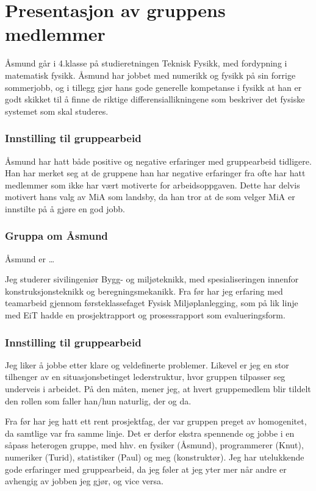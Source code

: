 \chapter{Presentasjon av gruppens medlemmer}
Åsmund går i 4.klasse på studieretningen Teknisk Fysikk, med fordypning 
i matematisk fysikk. Åsmund har jobbet med numerikk og fysikk på sin forrige 
sommerjobb, og i tillegg gjør hans gode generelle kompetanse i fysikk at han 
er godt skikket til å finne de riktige differensiallikningene som beskriver 
det fysiske systemet som skal studeres.

\subsection*{Innstilling til gruppearbeid}
Åsmund har hatt både positive og negative erfaringer med gruppearbeid tidligere.
Han har merket seg at de gruppene han har negative erfaringer fra ofte har hatt
medlemmer som ikke har vært motiverte for arbeidsoppgaven. Dette har delvis
motivert hans valg av MiA som landsby, da han tror at de som velger MiA er
innstilte på å gjøre en god jobb.

\subsection*{Gruppa om Åsmund}

Åsmund er \ldots

Jeg studerer sivilingeniør Bygg- og miljøteknikk, med
spesialiseringen innenfor konstruksjonsteknikk og beregningsmekanikk. Fra før
har jeg erfaring med teamarbeid gjennom førsteklassefaget Fysisk
Miljøplanlegging, som på lik linje med EiT hadde en prosjektrapport og
prosessrapport som evalueringsform.

\subsection*{Innstilling til gruppearbeid}

Jeg liker å jobbe etter klare og veldefinerte problemer. Likevel
er jeg en stor tilhenger av en situasjonsbetinget lederstruktur, hvor gruppen
tilpasser seg underveis i arbeidet. På den måten, mener jeg, at hvert
gruppemedlem blir tildelt den rollen som faller han/hun naturlig, der og da. 

Fra før har jeg hatt ett rent prosjektfag, der var gruppen preget av
homogenitet, da samtlige var fra samme linje. Det er derfor ekstra spennende og
jobbe i en såpass heterogen gruppe, med hhv. en fysiker (Åsmund), programmerer
(Knut), numeriker (Turid), statistiker (Paul) og meg (konstruktør). Jeg har
utelukkende gode erfaringer med gruppearbeid, da jeg føler at jeg yter mer når
andre er avhengig av jobben jeg gjør, og vice versa.

